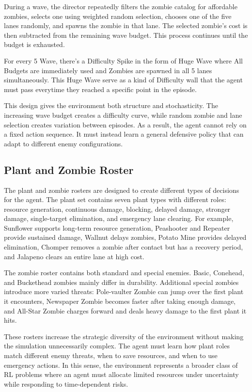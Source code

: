 \documentclass[conference,onecolumn]{IEEEtran}
\begin{document}
During a wave, the director repeatedly filters the zombie catalog for affordable zombies, selects one using weighted random selection, chooses one of the five lanes randomly, and spawns the zombie in that lane. The selected zombie's cost is then subtracted from the remaining wave budget. This process continues until the budget is exhausted.

For every 5 Wave, there's a Difficulty Spike in the form of Huge Wave where All Budgets are immediately used and Zombies are spawned in all 5 lanes simultaneously. This Huge Wave serve as a kind of Difficulty wall that the agent must pass everytime they reached a specific point in the episode.

This design gives the environment both structure and stochasticity. The increasing wave budget creates a difficulty curve, while random zombie and lane selection creates variation between episodes. As a result, the agent cannot rely on a fixed action sequence. It must instead learn a general defensive policy that can adapt to different enemy configurations.


\subsection{Plant and Zombie Roster}

The plant and zombie rosters are designed to create different types of decisions for the agent. The plant set contains seven plant types with different roles: resource generation, continuous damage, blocking, delayed damage, stronger damage, single-target elimination, and emergency lane clearing. For example, Sunflower supports long-term resource generation, Peashooter and Repeater provide sustained damage, Wallnut delays zombies, Potato Mine provides delayed elimination, Chomper removes a zombie after contact but has a recovery period, and Jalapeno clears an entire lane at high cost.

The zombie roster contains both standard and special enemies. Basic, Conehead, and Buckethead zombies mainly differ in durability. Additional special zombies introduce more varied threats: Pole-vaulter Zombie can jump over the first plant it encounters, Newspaper Zombie becomes faster after taking enough damage, and All-Star Zombie charges forward and deals heavy damage to the first plant it hits.

These rosters increase the strategic diversity of the environment without making the simulation unnecessarily complex. The agent must learn how plant roles match different enemy threats, when to save resources, and when to use emergency actions. In this sense, the environment represents a broader class of RL problems where an agent must allocate limited resources under uncertainty while responding to time-dependent risks.
\end{document}
